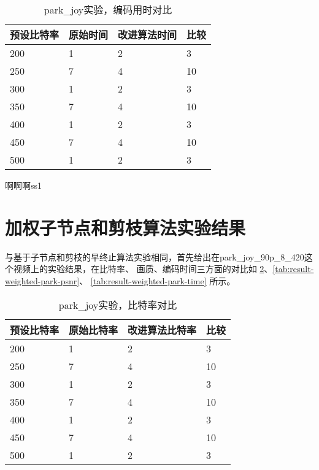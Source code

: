 \begin{table}[H]
  \centering
    \caption{park\_joy实验，编码用时对比}
    \label{tab:result-sum-park-time}
    \begin{tabularx}{\linewidth}{XXXX}
      \toprule[1.5pt]
      预设比特率 & 原始时间 & 改进算法时间 & 比较 \\
      \midrule[1pt]
      200 & 1 & 2 & 3  \\
      250 & 7 & 4 & 10 \\
      300 & 1 & 2 & 3  \\
      350 & 7 & 4 & 10 \\
      400 & 1 & 2 & 3  \\
      450 & 7 & 4 & 10 \\
      500 & 1 & 2 & 3  \\
      \bottomrule[1.5pt]
    \end{tabularx}
\end{table}

啊啊啊ss1



\section{加权子节点和剪枝算法实验结果}

与基于子节点和剪枝的早终止算法实验相同，首先给出在park\_joy\_90p\_8\_420这个视频上的实验结果，在比特率、
画质、编码时间三方面的对比如 \ref{tab:result-weighted-park-bitrate}、\ref{tab:result-weighted-park-psnr}、
\ref{tab:result-weighted-park-time} 所示。


\begin{table}[H]
  \caption{park\_joy实验，比特率对比}
    \label{tab:result-weighted-park-bitrate}
    \begin{tabularx}{\linewidth}{XXXX}
      \toprule[1.5pt]
      预设比特率 & 原始比特率 & 改进算法比特率 & 比较 \\
      \midrule[1pt]
      200 & 1 & 2 & 3  \\
      250 & 7 & 4 & 10 \\
      300 & 1 & 2 & 3  \\
      350 & 7 & 4 & 10 \\
      400 & 1 & 2 & 3  \\
      450 & 7 & 4 & 10 \\
      500 & 1 & 2 & 3  \\
      \bottomrule[1.5pt]
    \end{tabularx}
\end{table}

